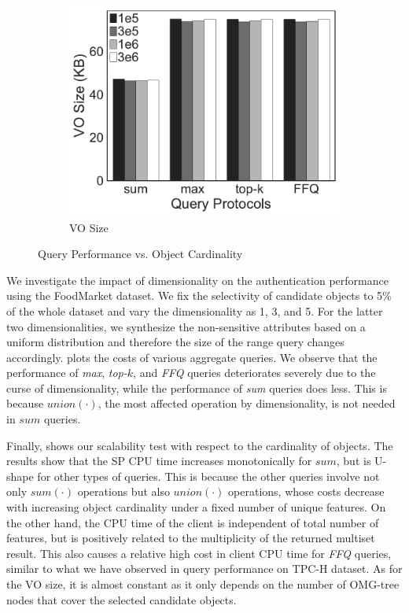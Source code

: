 \begin{figure}[t]
\begin{subfigure}[b]{.33\linewidth}
    \includegraphics[width=\linewidth]{exp-figs/aggregate-queries/cardinality_vo.pdf}
    \caption{VO Size}
  \end{subfigure}
  \caption{Query Performance vs. Object Cardinality}\label{fig:aggregate-queries:diversity}
\end{figure}

We investigate the impact of dimensionality on the authentication performance using the FoodMarket dataset. We fix the selectivity of candidate objects to 5\% of the whole dataset and vary the dimensionality as 1, 3, and 5. For the latter two dimensionalities, we synthesize the non-sensitive attributes based on a uniform distribution and therefore the size of the range query changes accordingly.  plots the costs of various aggregate queries. We observe that the performance of \emph{max}, \emph{top-$k$}, and \emph{FFQ} queries deteriorates severely due to the curse of dimensionality, while the performance of \emph{sum} queries does less. This is because $union(\cdot)$, the most affected operation by dimensionality, is not needed in $sum$ queries.

Finally,  shows our scalability test with respect to the cardinality of objects.
The results show that the SP CPU time increases monotonically for $sum$, but is U-shape for other types of queries. This is because the other queries involve not only $sum(\cdot)$ operations but also  $union(\cdot)$ operations, whose costs decrease with increasing object cardinality under a fixed number of unique features. On the other hand, the CPU time of the client is independent of total number of features, but is positively related to the multiplicity of the returned multiset result. This also causes a relative high cost in client CPU time for \emph{FFQ} queries, similar to what we have observed in query performance on TPC-H dataset. As for the VO size, it is almost constant as it only depends on the number of OMG-tree nodes that cover the selected candidate objects.

